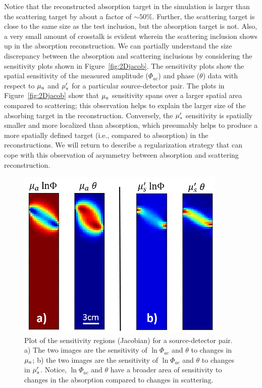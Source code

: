 Notice that the reconstructed absorption target in the simulation is larger than the scattering target by about a factor of $\sim 50\%$. Further, the scattering target is close to the same size as the test inclusion, but the absorption target is not. Also, a very small amount of crosstalk is evident wherein the scattering inclusion shows up in the absorption reconstruction. We can partially understand the size discrepancy between the absorption and scattering inclusions by considering the sensitivity plots shown in Figure~\ref{fig:2Djacob}. The sensitivity plots show the spatial sensitivity of the measured amplitude ($\Phi_{ac}$) and phase ($\theta$) data with respect to $\mu_a$ and $\mu_s^{\prime}$ for a particular source-detector pair. The plots in Figure~\ref{fig:2Djacob} show that $\mu_a$ sensitivity spans over a larger spatial area compared to scattering; this observation helps to explain the larger size of the absorbing target in the reconstruction. Conversely, the $\mu_s^{\prime}$ sensitivity is spatially smaller and more localized than absorption, which presumably helps to produce a more spatially defined target (i.e., compared to absorption) in the reconstructions. We will return to describe a regularization strategy that can cope with this observation of asymmetry between absorption and scattering reconstruction.

\begin{figure}[t]
\begin{center}
\includegraphics[width=10cm]{./figures/4_Gen3/2Djacob.png}
\caption[Plot of the sensitivity regions (Jacobian) for a source-detector pair]{Plot of the sensitivity regions (Jacobian) for a source-detector pair. a) The two images are the sensitivity of $\ln \Phi_{ac}$ and $\theta$ to changes in $\mu_a$; b) the two images are the sensitivity of $\ln \Phi_{ac}$ and $\theta$ to changes in $\mu_s^{\prime}$. Notice, $\ln \Phi_{ac}$ and $\theta$ have a broader area of sensitivity to changes in the absorption compared to changes in scattering.}
\end{center}
\end{figure}

